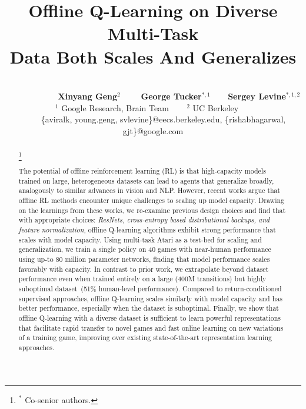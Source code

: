 \documentclass{article} %
\title{Offline Q-Learning on Diverse Multi-Task\\ Data Both Scales And Generalizes}
\author{
\qquad \qquad \qquad {\qquad \qquad Aviral Kumar$^{1, 2}$ ~~~ Rishabh Agarwal$^{1}$}  \vspace{0.1cm}\\
 \qquad \quad ~~~~~~~~~~~~ \textbf{Xinyang Geng$^{2}$ ~~~ George Tucker$^{*, 1}$~~~ Sergey Levine$^{*, 1, 2}$}\vspace{0.1cm}\\
\qquad \qquad \qquad ~~~~ {$^1$ Google Research, Brain Team ~~~ $^2$ UC Berkeley} ~~~~~~~ \vspace{0.1cm}\\
\qquad ~~~~~\small{{\{aviralk, young.geng, svlevine\}@eecs.berkeley.edu, \{rishabhagarwal, gjt\}@google.com}}}
\newcommand\blfootnote[1]{%
  \begingroup
  \renewcommand\thefootnote{}\footnote{#1}%
  \addtocounter{footnote}{-1}%
  \endgroup
}
\begin{document}
\maketitle

\begin{abstract}
\blfootnote{$^*$ Co-senior authors.}
The potential of offline reinforcement learning (RL) is that high-capacity models trained on large, heterogeneous datasets can lead to agents that generalize broadly, analogously to similar advances in vision and NLP. However, recent works argue that offline RL methods encounter unique challenges to scaling up model capacity. Drawing on the learnings from these works, we re-examine previous design choices and find that with appropriate choices: \emph{ResNets,
cross-entropy based distributional backups, and feature normalization}, offline Q-learning algorithms exhibit strong performance that scales with model capacity.
Using multi-task Atari as a test-bed for scaling and generalization, we train a single policy on 40 games with near-human performance using up-to 80 million parameter networks, finding that model performance scales favorably with capacity. In contrast to prior work, we extrapolate beyond dataset performance even when trained entirely on a large (400M transitions) but highly suboptimal dataset~(51\% human-level performance).
Compared to return-conditioned supervised approaches, offline Q-learning scales similarly with model capacity and has better performance, especially when the dataset is suboptimal. Finally, we show that offline Q-learning with a diverse dataset is sufficient to learn powerful representations that facilitate rapid transfer to novel games and fast online learning on new variations of a training game, improving over existing state-of-the-art representation learning approaches.  
\end{abstract}



















\newpage

\appendix


\end{document}
